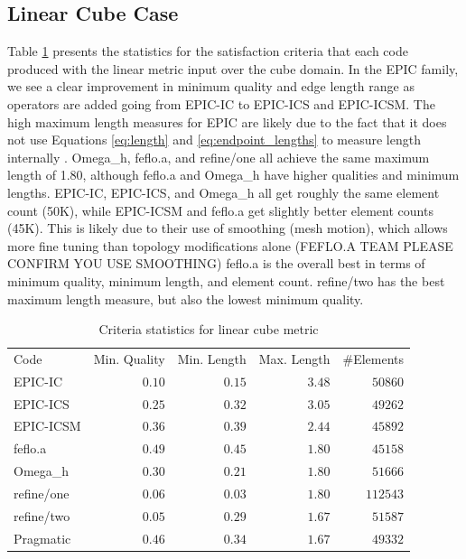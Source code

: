 \documentclass[3p,times,procedia,number]{elsarticle}
\begin{document}
\subsection{Linear Cube Case}

Table \ref{tab:cube-linear-stats} presents the statistics
for the satisfaction criteria that each code
produced with the linear metric input over the cube domain.
In the EPIC family, we see a clear improvement in minimum
quality and edge length range as operators are added
going from EPIC-IC to EPIC-ICS and EPIC-ICSM.
The high maximum length measures for EPIC are likely due
to the fact that it does not use Equations \ref{eq:length}
and \ref{eq:endpoint_lengths} to measure length
internally \cite{park-loseille-krakos-michal-adapt-decomposition}.
Omega\_h, feflo.a, and refine/one
all achieve the same maximum length of 1.80, although
feflo.a and Omega\_h have higher qualities
and minimum lengths.
EPIC-IC, EPIC-ICS, and Omega\_h all get roughly
the same element count (50K), while EPIC-ICSM and feflo.a
get slightly better element counts (45K).
This is likely due to their use of smoothing (mesh motion),
which allows more fine tuning than topology modifications alone
(FEFLO.A TEAM PLEASE CONFIRM YOU USE SMOOTHING)
feflo.a is the overall best in terms of minimum
quality, 
minimum length, and element count.
refine/two has the best maximum length measure,
but also the lowest minimum quality.

\begin{table}
\caption{Criteria statistics for linear cube metric}
\label{tab:cube-linear-stats}
\begin{tabular}{lrrrr}
Code & Min. Quality & Min. Length & Max. Length & \#Elements\\
EPIC-IC     & $0.10$&       $0.15$&       $3.48$&   $ 50860$\\
EPIC-ICS    & $0.25$&       $0.32$&       $3.05$&   $ 49262$\\
EPIC-ICSM   & $0.36$&       $0.39$&       $2.44$&   $ 45892$\\
feflo.a     & $0.49$&       $0.45$&       $1.80$&   $ 45158$\\
Omega\_h    & $0.30$&       $0.21$&       $1.80$&   $ 51666$\\
refine/one  & $0.06$&       $0.03$&       $1.80$&   $112543$\\
refine/two  & $0.05$&       $0.29$&       $1.67$&   $ 51587$\\
Pragmatic   & $0.46$&       $0.34$&       $1.67$&   $ 49332$\\
\end{tabular}
\end{table}
\end{document}
